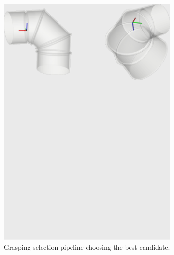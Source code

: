 \begin{figure}[h!]
{\begin{tcolorbox}
\begin{subfigure}[c]{1\textwidth}
          \includegraphics[trim={0cm 20cm 0cm 0cm},clip,width=1\linewidth,angle=0]{Cap5/Figuras/picking_mari4yard/grasping_selection.pdf}
          \caption{Grasping selection pipeline choosing the best candidate.}
          \label{fig:Double_side_bracket}
      \end{subfigure}
      \hfill
      \begin{subfigure}[c]{1\textwidth}
         \centering

\end{subfigure}
\end{tcolorbox}}
\end{figure}
